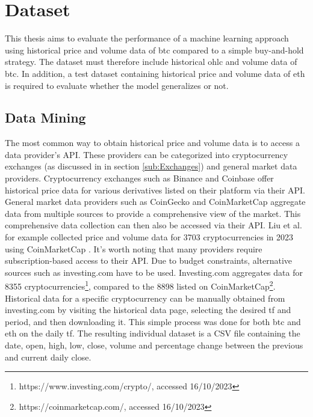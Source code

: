 \section{Dataset}
\label{sec:Data_Set}
This thesis aims to evaluate the performance of a machine learning approach using historical price and volume data of \gls{btc} compared to a simple buy-and-hold strategy. The dataset must therefore include historical \gls{ohlc} and volume data of \gls{btc}. In addition, a test dataset containing historical price and volume data of \gls{eth} is required to evaluate whether the model generalizes or not. 

\subsection{Data Mining}
\label{sub:Data_Mining}
The most common way to obtain historical price and volume data is to access a data provider's API. These providers can be categorized into cryptocurrency exchanges (as discussed in in section \ref{sub:Exchanges}) and general market data providers. Cryptocurrency exchanges such as Binance and Coinbase offer historical price data for various derivatives listed on their platform via their API. General market data providers such as CoinGecko and CoinMarketCap aggregate data from multiple sources to provide a comprehensive view of the market. This comprehensive data collection can then also be accessed via their API. Liu et al. for example collected price and volume data for 3703 cryptocurrencies in 2023 using CoinMarketCap \citep{liu2023forecasting}.
\newline
\newline
It's worth noting that many providers require subscription-based access to their API. Due to budget constraints, alternative sources such as investing.com have to be used. Investing.com aggregates data for 8355 cryptocurrencies\footnote{https://www.investing.com/crypto/, accessed 16/10/2023}, compared to the 8898 listed on CoinMarketCap\footnote{https://coinmarketcap.com/, accessed 16/10/2023}. Historical data for a specific cryptocurrency can be manually obtained from investing.com by visiting the historical data page, selecting the desired \gls{tf} and period, and then downloading it. This simple process was done for both \gls{btc} and \gls{eth} on the daily \gls{tf}.
\newline
\newline
The resulting individual dataset is a CSV file containing the date, open, high, low, close, volume and percentage change between the previous and current daily close.

